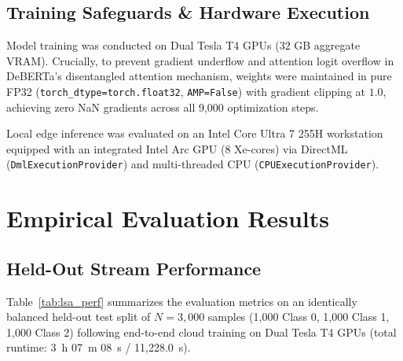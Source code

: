 \documentclass[10pt,journal,compsoc]{IEEEtran}
\begin{document}
\subsection{Training Safeguards \& Hardware Execution}
Model training was conducted on Dual Tesla T4 GPUs (32 GB aggregate VRAM). Crucially, to prevent gradient underflow and attention logit overflow in DeBERTa's disentangled attention mechanism, weights were maintained in pure FP32 (\texttt{torch\_dtype=torch.float32}, \texttt{AMP=False}) with gradient clipping at $1.0$, achieving zero NaN gradients across all 9,000 optimization steps.

Local edge inference was evaluated on an Intel Core Ultra 7 255H workstation equipped with an integrated Intel Arc GPU (8 Xe-cores) via DirectML (\texttt{DmlExecutionProvider}) and multi-threaded CPU (\texttt{CPUExecutionProvider}).

\section{Empirical Evaluation Results}

\subsection{Held-Out Stream Performance}
Table~\ref{tab:lsa_perf} summarizes the evaluation metrics on an identically balanced held-out test split of $N = 3,000$ samples (1,000 Class 0, 1,000 Class 1, 1,000 Class 2) following end-to-end cloud training on Dual Tesla T4 GPUs (total runtime: 3~h 07~m 08~s / 11,228.0~s).
\end{document}
